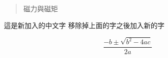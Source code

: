 \documentclass[12pt,A4paper]{article}
\begin{document}
\begin{abstract}
磁力與磁矩
\end{abstract}
 這是新加入的中文字
移除掉上面的字之後加入新的字

\[ 
   \frac{-b\pm\sqrt{b^2-4ac}}{2a} 
\]
\end{document}
